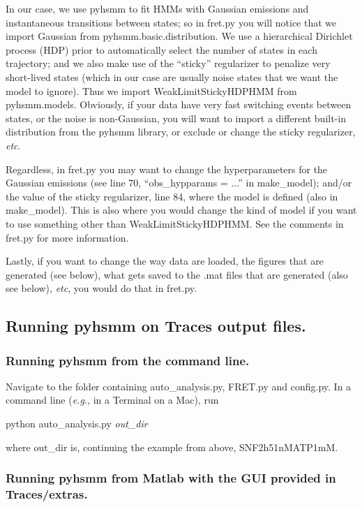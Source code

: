 \documentclass[11pt]{article}
\begin{document}
In our case, we use pyhsmm to fit HMMs with Gaussian emissions and instantaneous transitions between states; so in fret.py you will notice that we import Gaussian from pyhsmm.basic.distribution. We use a hierarchical Dirichlet process (HDP) prior to automatically select the number of states in each trajectory; and we also make use of the ``sticky'' regularizer to penalize very short-lived states (which in our case are usually noise states that we want the model to ignore). Thus we import WeakLimitStickyHDPHMM from pyhsmm.models. Obviously, if your data have very fast switching events between states, or the noise is non-Gaussian, you will want to import a different built-in distribution from the pyhsmm library, or exclude or change the sticky regularizer, {\it etc}.

Regardless, in fret.py you may want to change the hyperparameters for the Gaussian emissions (see line 70, ``obs\_hypparams = ...'' in make\_model); and/or the value of the sticky regularizer, line 84, where the model is defined (also in make\_model). This is also where you would change the kind of model if you want to use something other than WeakLimitStickyHDPHMM. See the comments in fret.py for more information.

Lastly, if you want to change the way data are loaded, the figures that are generated (see below), what gets saved to the .mat files that are generated (also see below), {\it etc}, you would do that in fret.py.

\subsection{Running pyhsmm on Traces output files.}

\subsubsection{Running pyhsmm from the command line.}

Navigate to the folder containing auto\_analysis.py, FRET.py and config.py. In a command line ({\it e.g.}, in a Terminal on a Mac), run

python auto\_analysis.py {\it out\_dir}

\noindent where out\_dir is, continuing the example from above, SNF2h51nMATP1mM.

\subsubsection{Running pyhsmm from Matlab with the GUI provided in Traces/extras.}
\end{document}
